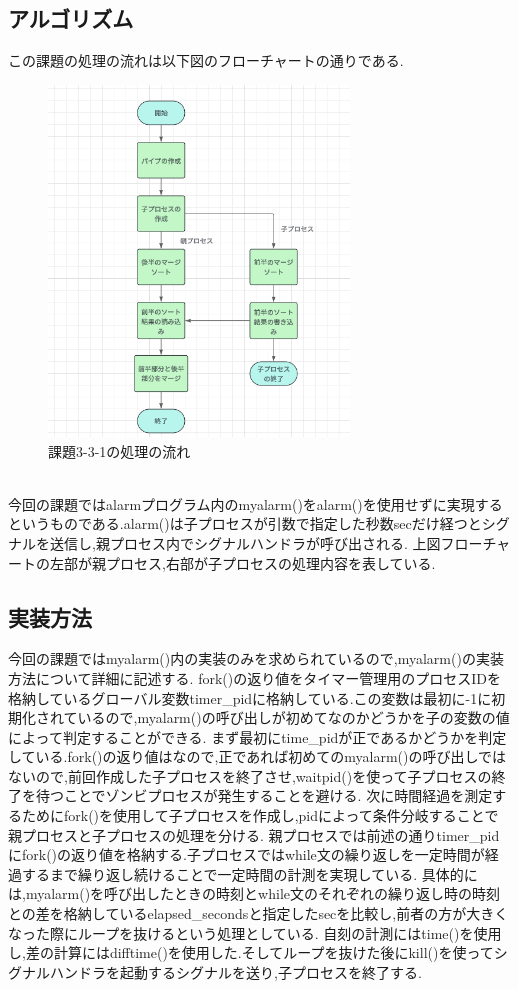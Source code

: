 \documentclass[dvipdfmx]{jarticle}
\begin{document}
\subsection{アルゴリズム}
この課題の処理の流れは以下図のフローチャートの通りである.
\begin{figure}[h]
    \centering
    \includegraphics[width=8cm]{3-2-2hurotya.png}
    \caption{課題3-3-1の処理の流れ}
\end{figure}
\\
今回の課題ではalarmプログラム内のmyalarm()をalarm()を使用せずに実現するというものである.alarm()は子プロセスが引数で指定した秒数secだけ経つとシグナルを送信し,親プロセス内でシグナルハンドラが呼び出される.
上図フローチャートの左部が親プロセス,右部が子プロセスの処理内容を表している.
\subsection{実装方法}
今回の課題ではmyalarm()内の実装のみを求められているので,myalarm()の実装方法について詳細に記述する.
fork()の返り値をタイマー管理用のプロセスIDを格納しているグローバル変数timer\_pidに格納している.この変数は最初に-1に初期化されているので,myalarm()の呼び出しが初めてなのかどうかを子の変数の値によって判定することができる.
まず最初にtime\_pidが正であるかどうかを判定している.fork()の返り値はなので,正であれば初めてのmyalarm()の呼び出しではないので,前回作成した子プロセスを終了させ,waitpid()を使って子プロセスの終了を待つことでゾンビプロセスが発生することを避ける.
次に時間経過を測定するためにfork()を使用して子プロセスを作成し,pidによって条件分岐することで親プロセスと子プロセスの処理を分ける.
親プロセスでは前述の通りtimer\_pidにfork()の返り値を格納する.子プロセスではwhile文の繰り返しを一定時間が経過するまで繰り返し続けることで一定時間の計測を実現している.
具体的には,myalarm()を呼び出したときの時刻とwhile文のそれぞれの繰り返し時の時刻との差を格納しているelapsed\_secondsと指定したsecを比較し,前者の方が大きくなった際にループを抜けるという処理としている.
自刻の計測にはtime()を使用し,差の計算にはdifftime()を使用した.そしてループを抜けた後にkill()を使ってシグナルハンドラを起動するシグナルを送り,子プロセスを終了する.
\end{document}

